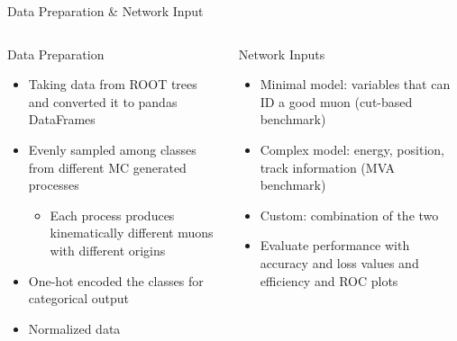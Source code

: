 \documentclass[10pt,handout]{beamer}
\begin{document}
\begin{frame}{Data Preparation \& Network Input}
\begin{columns}
\begin{column}{0.5\textwidth}
Data Preparation
\begin{itemize}
\item Taking data from ROOT trees and converted it to pandas DataFrames
\item Evenly sampled among classes from different MC generated processes
\begin{itemize}
\item Each process produces kinematically different muons with different origins
\end{itemize}
\item One-hot encoded the classes for categorical output
\item Normalized data
\end{itemize}
\end{column}

\begin{column}{0.5\textwidth}
Network Inputs
\begin{itemize}
\item Minimal model: variables that can ID a good muon (cut-based benchmark)
\item Complex model: energy, position, track information (MVA benchmark)
\item Custom: combination of the two
\item Evaluate performance with accuracy and loss values and efficiency and ROC plots
\end{itemize}
\end{column}
\end{columns}
\end{frame}
\end{document}
